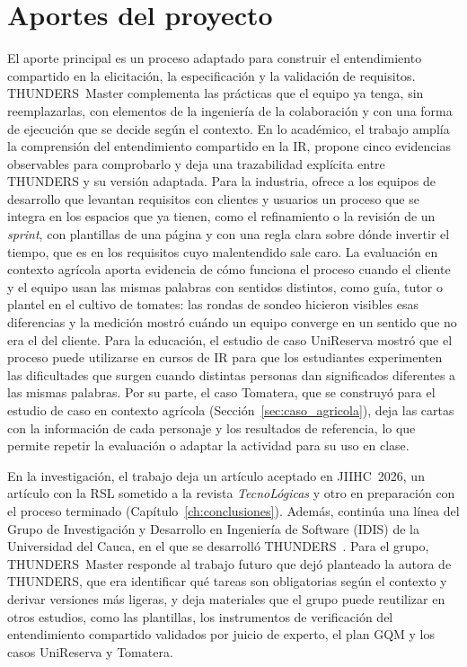 \documentclass[12pt,letterpaper,oneside]{report}
\begin{document}
\section{Aportes del proyecto}
El aporte principal es un proceso adaptado para construir el entendimiento
compartido en la elicitación, la especificación y la validación de requisitos.
THUNDERS~Master complementa las prácticas que el equipo ya tenga, sin
reemplazarlas, con elementos de la ingeniería de la colaboración y con una forma
de ejecución que se decide según el contexto. En lo académico, el trabajo amplía
la comprensión del entendimiento compartido en la IR, propone cinco evidencias
observables para comprobarlo y deja una trazabilidad explícita entre THUNDERS y
su versión adaptada. Para la industria, ofrece a los equipos de desarrollo que
levantan requisitos con clientes y usuarios un proceso que se integra en los
espacios que ya tienen, como el refinamiento o la revisión de un
\textit{sprint}, con plantillas de una página y con una regla clara sobre dónde
invertir el tiempo, que es en los requisitos cuyo malentendido sale caro. La
evaluación en contexto agrícola aporta evidencia de cómo funciona el proceso
cuando el cliente y el equipo usan las mismas palabras con sentidos distintos,
como guía, tutor o plantel en el cultivo de tomates: las rondas de sondeo
hicieron visibles esas diferencias y la medición mostró cuándo un equipo
converge en un sentido que no era el del cliente. Para la educación, el estudio de caso 
UniReserva mostró que el proceso puede utilizarse en cursos de IR para que los 
estudiantes experimenten las dificultades que surgen cuando distintas personas 
dan significados diferentes a las mismas palabras. Por su parte, el caso
Tomatera, que se construyó para el estudio de caso en contexto agrícola
(Sección~\ref{sec:caso_agricola}), deja las cartas con la información de cada
personaje y los resultados de referencia, lo que permite repetir la evaluación o
adaptar la actividad para su uso en clase.

En la investigación, el trabajo deja un artículo aceptado en JIIHC~2026, un
artículo con la RSL sometido a la revista \textit{TecnoLógicas} y otro en
preparación con el proceso terminado (Capítulo~\ref{ch:conclusiones}). Además,
continúa una línea del Grupo de Investigación y Desarrollo en Ingeniería de
Software (IDIS) de la Universidad del Cauca, en el que se desarrolló
THUNDERS~\cite{agredo2022thesis}. Para el grupo, THUNDERS~Master responde al
trabajo futuro que dejó planteado la autora de THUNDERS, que era identificar qué
tareas son obligatorias según el contexto y derivar versiones más ligeras, y
deja materiales que el grupo puede reutilizar en otros estudios, como las
plantillas, los instrumentos de verificación del entendimiento compartido
validados por juicio de experto, el plan GQM y los casos UniReserva y Tomatera.
\end{document}
